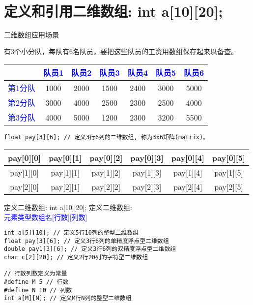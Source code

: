 


\section{定义和引用二维数组: int a[10][20];}

\begin{frame}{二维数组应用场景}
\vspace{-0.3cm}
\begin{example}
	有3个小分队，每队有6名队员，要把这些队员的工资用数组保存起来以备查。
	\begin{tabular}{|c|c|c|c|c|c|c|}
		\hline 
	     & \textcolor{blue}{队员1} & \textcolor{blue}{队员2} & \textcolor{blue}{队员3} & \textcolor{blue}{队员4} & \textcolor{blue}{队员5} & \textcolor{blue}{队员6}\\
	    \hline  
	    \textcolor{blue}{第1分队}& 1000 & 2000 & 1500 & 2400 & 3000 & 5000\\ 
		\hline 
		\textcolor{blue}{第2分队}& 3000 & 4000 & 2500 & 2300 & 2500 & 4000\\ 
		\hline 
		\textcolor{blue}{第3分队}& 4000 & 5000 & 1200 & 2300 & 3200 & 5500\\ 
		\hline 
	\end{tabular} 
\end{example}
\begin{lstlisting}
float pay[3][6]; // 定义3行6列的二维数组, 称为3x6矩阵(matrix)。
\end{lstlisting}
\begin{tabular}{|c|c|c|c|c|c|}
	\hline  
	pay[0][0] & pay[0][1] & pay[0][2] & pay[0][3] & pay[0][4] & pay[0][5] \\ 
	\hline 
	pay[1][0] & pay[1][1] & pay[1][2] & pay[1][3] & pay[1][4] & pay[1][5] \\ 
	\hline 
	pay[2][0] & pay[2][1] & pay[2][2] & pay[2][3] & pay[2][4] & pay[2][5] \\ 
	\hline 
\end{tabular} 
\end{frame}

\begin{frame}{定义二维数组: int a[10][20];}
定义二维数组: \\
\textcolor{blue}{元素类型\quad 数组名[行数][列数]}
\begin{lstlisting}
int a[5][10]; // 定义5行10列的整型二维数组
float pay[3][6]; // 定义3行6列的单精度浮点型二维数组
double pay1[3][6]; // 定义3行6列的双精度浮点型二维数组
char c[2][20]; // 定义2行20列的字符型二维数组

// 行数列数定义为常量
#define M 5 // 行数
#define N 10 // 列数
int a[M][N]; // 定义M行N列的整型二维数组
\end{lstlisting}
\end{frame}

